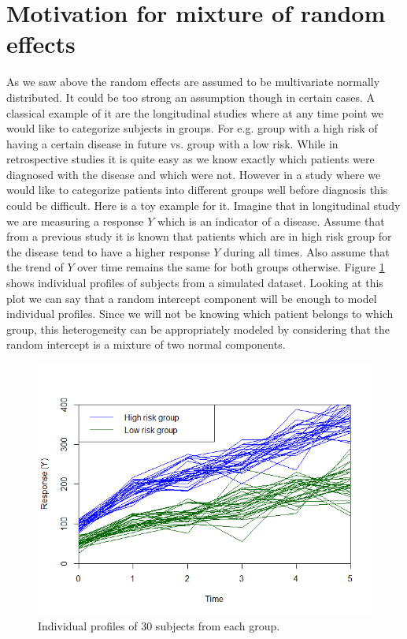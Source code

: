 \section{Motivation for mixture of random effects}
As we saw above the random effects are assumed to be multivariate normally distributed. It could be too strong an assumption though in certain cases. A classical example of it are the longitudinal studies where at any time point we would like to categorize subjects in groups. For e.g. group with a high risk of having a certain disease in future vs. group with a low risk. While in retrospective studies it is quite easy as we know exactly which patients were diagnosed with the disease and which were not. However in a study where we would like to categorize patients into different groups well before diagnosis this could be difficult. Here is a toy example for it. Imagine that in longitudinal study we are measuring a response $Y$ which is an indicator of a disease. Assume that from a previous study it is known that patients which are in high risk group for the disease tend to have a higher response $Y$ during all times. Also assume that the trend of $Y$ over time remains the same for both groups otherwise. Figure \ref{fig : random_slope_dummy_data} shows individual profiles of subjects from a simulated dataset. Looking at this plot we can say that a random intercept component will be enough to model individual profiles. Since we will not be knowing which patient belongs to which group, this heterogeneity can be appropriately modeled by considering that the random intercept is a mixture of two normal components.\\

\begin{figure}
	\centering
	\includegraphics[scale=0.5]{mainmatter/chapter_3_blmm/random_slope_dummy_data.png}
	\caption{Individual profiles of 30 subjects from each group.}
	\label{fig : random_slope_dummy_data}
\end{figure}


